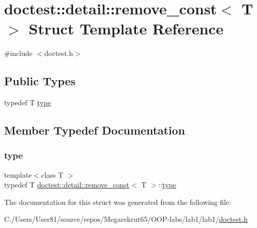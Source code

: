 \hypertarget{structdoctest_1_1detail_1_1remove__const}{}\section{doctest\+:\+:detail\+:\+:remove\+\_\+const$<$ T $>$ Struct Template Reference}
\label{structdoctest_1_1detail_1_1remove__const}


{\ttfamily \#include $<$doctest.\+h$>$}

\subsection*{Public Types}
\begin{DoxyCompactItemize}
\item 
typedef T \mbox{\hyperlink{structdoctest_1_1detail_1_1remove__const_ad6a97a5d2fcb5f513bbff8ea12e280f8}{type}}
\end{DoxyCompactItemize}


\subsection{Member Typedef Documentation}
\mbox{\label{structdoctest_1_1detail_1_1remove__const_ad6a97a5d2fcb5f513bbff8ea12e280f8}} 
\subsubsection{\texorpdfstring{type}{type}}
{\footnotesize\ttfamily template$<$class T $>$ \\
typedef T \mbox{\hyperlink{structdoctest_1_1detail_1_1remove__const}{doctest\+::detail\+::remove\+\_\+const}}$<$ T $>$\+::\mbox{\hyperlink{structdoctest_1_1detail_1_1remove__const_ad6a97a5d2fcb5f513bbff8ea12e280f8}{type}}}



The documentation for this struct was generated from the following file\+:\begin{DoxyCompactItemize}
\item 
C\+:/\+Users/\+User81/source/repos/\+Megarekrut65/\+O\+O\+P-\/labs/lab1/lab1/\mbox{\hyperlink{doctest_8h}{doctest.\+h}}\end{DoxyCompactItemize}
